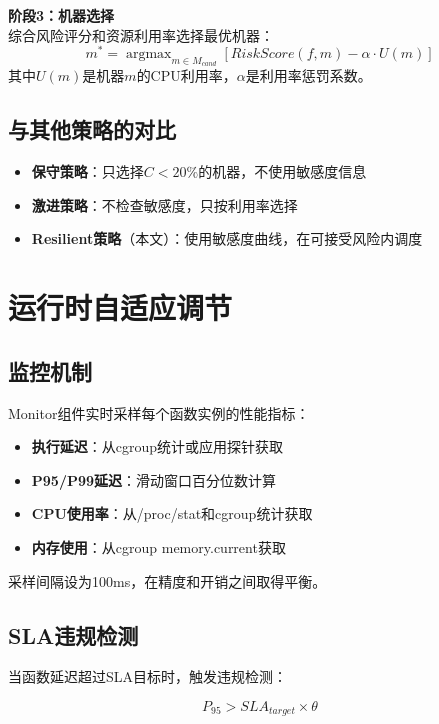 \documentclass[11pt, a4paper, oneside]{article}
\DeclareMathOperator*{\argmax}{argmax}
\begin{document}
\textbf{阶段3：机器选择} \\
综合风险评分和资源利用率选择最优机器：
\begin{equation}
m^* = \argmax_{m \in M_{cand}} \left[ RiskScore(f, m) - \alpha \cdot U(m) \right]
\end{equation}
其中$U(m)$是机器$m$的CPU利用率，$\alpha$是利用率惩罚系数。

\subsection{与其他策略的对比}

\begin{itemize}
    \item \textbf{保守策略}：只选择$C < 20\%$的机器，不使用敏感度信息
    \item \textbf{激进策略}：不检查敏感度，只按利用率选择
    \item \textbf{Resilient策略}（本文）：使用敏感度曲线，在可接受风险内调度
\end{itemize}

\section{运行时自适应调节}

\subsection{监控机制}

Monitor组件实时采样每个函数实例的性能指标：

\begin{itemize}
    \item \textbf{执行延迟}：从cgroup统计或应用探针获取
    \item \textbf{P95/P99延迟}：滑动窗口百分位数计算
    \item \textbf{CPU使用率}：从/proc/stat和cgroup统计获取
    \item \textbf{内存使用}：从cgroup memory.current获取
\end{itemize}

采样间隔设为100ms，在精度和开销之间取得平衡。

\subsection{SLA违规检测}

当函数延迟超过SLA目标时，触发违规检测：

\[
P_{95} > SLA_{target} \times \theta
\]
\end{document}
